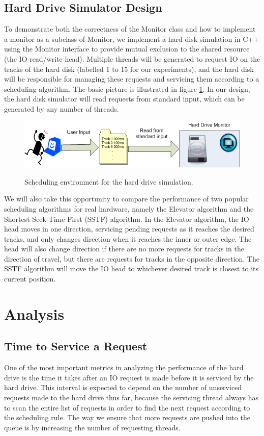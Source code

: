 \documentclass{report}
\begin{document}
\subsection{Hard Drive Simulator Design}
To demonstrate both the correctness of the Monitor class and how to implement a monitor as
a subclass of Monitor, we implement a hard disk simulation in C++ using the Monitor
interface to provide mutual exclusion to the shared resource (the IO read/write head).
Multiple threads will be generated to request IO on the tracks of the hard disk (labelled
1 to 15 for our experiments), and the hard disk will be responsible for managing these
requests and servicing them according to a scheduling algorithm. The basic picture is
illustrated in figure \ref{fig:sched}. In our design, the hard disk simulator will read
requests from standard input, which can be generated by any number of threads.
\begin{figure}[htb!]
    \centering
    \includegraphics[scale=0.6]{Scheduling_Env.png}
    \label{fig:sched}
    \caption{Scheduling environment for the hard drive simulation.}
\end{figure}

We will also take this opportunity to compare the performance of two popular scheduling
algorithms for real hardware, namely the Elevator algorithm and the Shortest Seek-Time
First (SSTF) algorithm. In the Elevator algorithm, the IO head moves in one direction,
servicing pending requests as it reaches the desired tracks, and only changes direction
when it reaches the inner or outer edge. The head will also change direction if there are 
no more requests for tracks in the direction of travel, but there are requests for tracks
in the opposite direction. The SSTF algorithm will move the IO head to whichever desired
track is closest to its current position.

\newpage
\section{Analysis} %
\subsection{Time to Service a Request}
One of the most important metrics in analyzing the performance of the hard drive is the
time it takes after an IO request is made before it is serviced by the hard drive. This
interval is expected to depend on the number of unserviced requests made to the hard drive
thus far, because the servicing thread always has to scan the entire list of requests in
order to find the next request according to the scheduling rule. The way we ensure that
more requests are pushed into the queue is by increasing the number of requesting threads.
\end{document}
